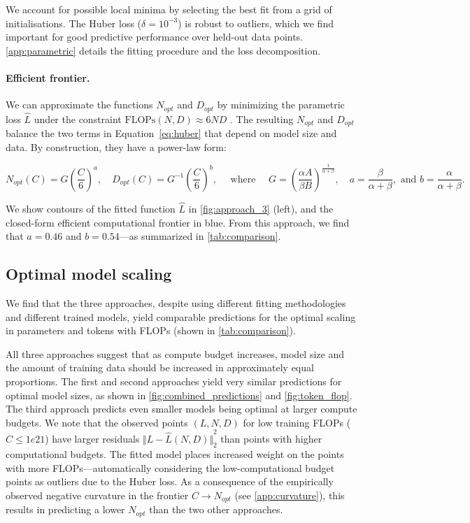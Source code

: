 We account for possible local minima by selecting the best fit from a grid of initialisations. The Huber loss ($\delta=10^{-3}$) is robust to outliers, which we find important for good predictive performance over held-out data points. \autoref{app:parametric} details the fitting procedure and the loss decomposition.

\paragraph{Efficient frontier.} We can approximate the functions $N_{opt}$ and $D_{opt}$ by minimizing the parametric loss $\hat L$ under the constraint
$\text{FLOPs}(N, D) \approx 6 N D$ \citep{kaplan2020scaling}. The resulting $N_{opt}$ and $D_{opt}$ balance the two terms in Equation~\eqref{eq:huber} that depend on model size and data. By construction, they have a power-law form:

\begin{equation}
    N_{opt}(C) = G {\left(\frac{C}{6}\right)}^{a}, \quad
    D_{opt}(C) = G^{-1} {\left(\frac{C}{6}\right)}^{b}, \quad \text{ where }\quad
    G = {\left(\frac{\alpha A}{\beta B} \right)}^{\frac{1}{\alpha + \beta}},\quad
    a = \frac{\beta}{\alpha+\beta}, \text{ and } b = \frac{\alpha}{\alpha + \beta}.
\end{equation}

We show contours of the fitted function $\hat L$ in \autoref{fig:approach_3} (left), and the closed-form efficient computational frontier in blue. From this approach, we find that $a=0.46$ and $b=0.54$---as summarized in \autoref{tab:comparison}.

\subsection{Optimal model scaling}
\label{sec:scaling-results}
We find that the three approaches, despite using different fitting methodologies and different trained models, yield comparable predictions for the optimal scaling in parameters and tokens with FLOPs (shown in \autoref{tab:comparison}).

All three approaches suggest that as compute budget increases, model size and the amount of training data should be increased in approximately equal proportions. The first and second approaches yield very similar predictions for optimal model sizes, as shown in \autoref{fig:combined_predictions} and \autoref{fig:token_flop}.
The third approach predicts even smaller models being optimal at larger compute budgets. We note that the observed points $(L, N, D)$ for low training FLOPs ($C\leqslant1e21$) have larger residuals ${\Vert L - \hat L(N, D) \Vert}_2^2$ than points with higher computational budgets. The fitted model places increased weight on the points with more FLOPs---automatically considering the low-computational budget points as outliers due to the Huber loss. As a consequence of the empirically observed negative curvature in the frontier $C \to N_{opt}$ (see \autoref{app:curvature}), this results in predicting a lower $N_{opt}$ than the two other approaches.


